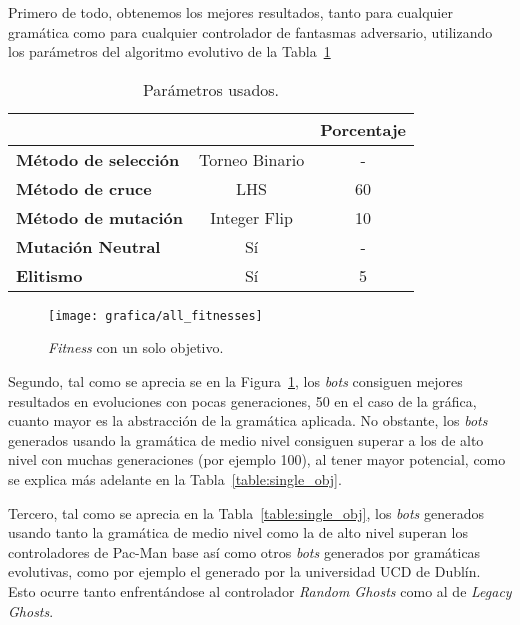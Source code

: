 Primero de todo, obtenemos los mejores resultados, tanto para cualquier gramática como para cualquier controlador de fantasmas adversario, utilizando los parámetros del algoritmo evolutivo de la Tabla~\ref{table:best-params-es}
\begin{table}[H]
\centering
\begin{tabular}{lc|c|}
\cline{3-3}
                                                   &                              & \textbf{Porcentaje} \\ \hline
\multicolumn{1}{|l|}{\textbf{Método de selección}} & Torneo Binario \footnotemark & -                   \\ \hline
\multicolumn{1}{|l|}{\textbf{Método de cruce}}     & LHS                                                           & 60                  \\ \hline
\multicolumn{1}{|l|}{\textbf{Método de mutación}}  & Integer Flip                                                  & 10                  \\ \hline
\multicolumn{1}{|l|}{\textbf{Mutación Neutral}}    & Sí                                                            & -                   \\ \hline
\multicolumn{1}{|l|}{\textbf{Elitismo}}            & Sí                                                            & 5                   \\ \hline
\end{tabular}
\caption{Parámetros usados.}
\label{table:best-params-es}
\end{table}

\begin{figure}[]
\centering
\texttt{[image: grafica/all\_fitnesses]}
\caption{\textit{Fitness} con un solo objetivo.}
\label{graph:all_fitness}
\end{figure}

Segundo, tal como se aprecia se en la Figura~\ref{graph:all_fitness}, los \textit{bots} consiguen mejores resultados en evoluciones con pocas generaciones, 50 en el caso de la gráfica, cuanto mayor es la abstracción de la gramática aplicada. No obstante, los \textit{bots} generados usando la gramática de medio nivel consiguen superar a los de alto nivel con muchas generaciones (por ejemplo 100), al tener mayor potencial, como se explica más adelante en la Tabla~\ref{table:single_obj}.
 
Tercero, tal como se aprecia en la Tabla~\ref{table:single_obj}, los \textit{bots} generados usando tanto la gramática de medio nivel como la de alto nivel superan los controladores de Pac-Man base así como otros \textit{bots} generados por gramáticas evolutivas, como por ejemplo el generado por la universidad UCD de Dublín. Esto ocurre tanto enfrentándose al controlador \textit{Random Ghosts} como al de \textit{Legacy Ghosts}.
 
